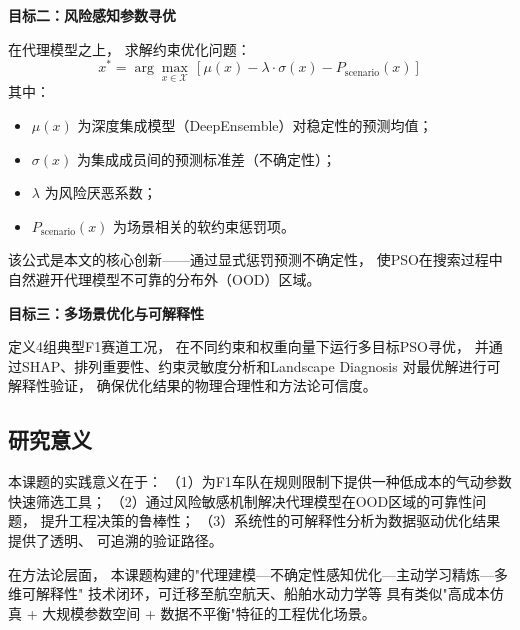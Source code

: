 \noindent
\textbf{目标二：风险感知参数寻优}

在代理模型之上，
求解约束优化问题：
\begin{equation}
    x^* = \arg\max_{x \in \mathcal{X}} \,
    \left[ \mu(x) - \lambda \cdot \sigma(x) - P_{\text{scenario}}(x) \right]
    \label{eq:obj}
\end{equation}
其中：
\begin{itemize}
    \item $\mu(x)$ 为深度集成模型（DeepEnsemble）对稳定性的预测均值；
    \item $\sigma(x)$ 为集成成员间的预测标准差（不确定性）；
    \item $\lambda$ 为风险厌恶系数；
    \item $P_{\text{scenario}}(x)$ 为场景相关的软约束惩罚项。
\end{itemize}

该公式是本文的核心创新——通过显式惩罚预测不确定性，
使PSO在搜索过程中自然避开代理模型不可靠的分布外（OOD）区域。

\vspace{0.3cm}

\noindent
\textbf{目标三：多场景优化与可解释性}

定义4组典型F1赛道工况，
在不同约束和权重向量下运行多目标PSO寻优，
并通过SHAP、排列重要性、约束灵敏度分析和Landscape Diagnosis
对最优解进行可解释性验证，
确保优化结果的物理合理性和方法论可信度。

\subsection{研究意义}

本课题的实践意义在于：
（1）为F1车队在规则限制下提供一种低成本的气动参数快速筛选工具；
（2）通过风险敏感机制解决代理模型在OOD区域的可靠性问题，
提升工程决策的鲁棒性；
（3）系统性的可解释性分析为数据驱动优化结果提供了透明、
可追溯的验证路径。

在方法论层面，
本课题构建的"代理建模—不确定性感知优化—主动学习精炼—多维可解释性"
技术闭环，可迁移至航空航天、船舶水动力学等
具有类似"高成本仿真 + 大规模参数空间 + 数据不平衡"特征的工程优化场景。
